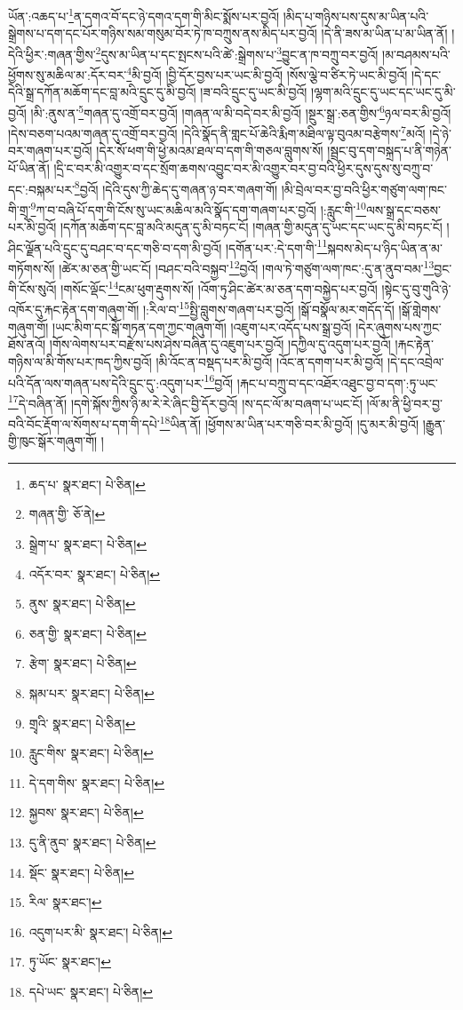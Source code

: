 ཡོན་:འཆད་པ་\footnote{ཆད་པ་  སྣར་ཐང་།  པེ་ཅིན། }ན་དགའ་བོ་དང་ཉེ་དགའ་དག་གི་མིང་སྨོས་པར་བྱའོ། །མིད་པ་གཉིས་པས་དུས་མ་ཡིན་པའི་སྒྲེགས་པ་དག་དང་པོར་གཉིས་སམ་གསུམ་བོར་ཏེ་ཁ་བཀྲུས་ནས་མིད་པར་བྱའོ། །དེ་ནི་ཟས་མ་ཡིན་པ་མ་ཡིན་ནོ། །དེའི་ཕྱིར་:གཞན་གྱིས་\footnote{གཞན་གྱི་  ཅོ་ནེ། }དུས་མ་ཡིན་པ་དང་སྤངས་པའི་ཚེ་:སྒྲེགས་པ་\footnote{སྒྲེག་པ་  སྣར་ཐང་།  པེ་ཅིན། }བྱུང་ན་ཁ་བཀྲུ་བར་བྱའོ། །མ་བཤམས་པའི་ཕྱོགས་སུ་མཆིལ་མ་:དོར་བར་\footnote{འདོར་བར་  སྣར་ཐང་།  པེ་ཅིན། }མི་བྱའོ། །བྱི་དོར་བྱས་པར་ཡང་མི་བྱའོ། །སོས་ལྕེ་བ་ཙིར་ཏེ་ཡང་མི་བྱའོ། །དེ་དང་དེའི་སྒྲ་དཀོན་མཆོག་དང་བླ་མའི་དྲུང་དུ་མི་བྱའོ། །ཟ་བའི་དྲུང་དུ་ཡང་མི་བྱའོ། །ལྷག་མའི་དྲུང་དུ་ཡང་དང་ཡང་དུ་མི་བྱའོ། །མི་:ནུས་ན་\footnote{ནུས་  སྣར་ཐང་།  པེ་ཅིན། }གཞན་དུ་འགྲོ་བར་བྱའོ། །གཞན་ལ་མི་བདེ་བར་མི་བྱའོ། །སྔུར་སྒྲ་:ཅན་གྱིས་\footnote{ཅན་གྱི་  སྣར་ཐང་།  པེ་ཅིན། }ཉལ་བར་མི་བྱའོ། །དེས་བཅག་པའམ་གཞན་དུ་འགྲོ་བར་བྱའོ། །དེའི་སྣོད་ནི་གླང་པོ་ཆེའི་རྨིག་མཐིལ་ལྟ་བུའམ་བརྩེགས་\footnote{རྩེག་  སྣར་ཐང་།  པེ་ཅིན། }མའོ། །དེ་ཉེ་བར་གཞག་པར་བྱའོ། །དེར་སོ་ཕག་གི་ཕྱེ་མའམ་ཐལ་བ་དག་གི་གཅལ་བླུགས་སོ། །སྦྲང་བུ་དག་བསྐྲད་པ་ནི་གཉེན་པོ་ཡིན་ནོ། །དྲི་ང་བར་མི་འགྱུར་བ་དང་སྲོག་ཆགས་འབྱུང་བར་མི་འགྱུར་བར་བྱ་བའི་ཕྱིར་དུས་དུས་སུ་བཀྲུ་བ་དང་:བསྐམ་པར་\footnote{སྐམ་པར་  སྣར་ཐང་།  པེ་ཅིན། }བྱའོ། །དེའི་དུས་ཀྱི་ཆེད་དུ་གཞན་ཉ་བར་གཞག་གོ། །མི་བྲེལ་བར་བྱ་བའི་ཕྱིར་གཙུག་ལག་ཁང་གི་གྲྭ་\footnote{གྲྭའི་  སྣར་ཐང་།  པེ་ཅིན། }ཀ་བ་བཞི་པོ་དག་གི་ངོས་སུ་ཡང་མཆིལ་མའི་སྣོད་དག་གཞག་པར་བྱའོ། །:རླུང་གི་\footnote{རླུང་གིས་  སྣར་ཐང་།  པེ་ཅིན། }ལས་སྒྲ་དང་བཅས་པར་མི་བྱའོ། །དཀོན་མཆོག་དང་བླ་མའི་མདུན་དུ་མི་བཏང་ངོ། །གཞན་གྱི་མདུན་དུ་ཡང་དང་ཡང་དུ་མི་བཏང་ངོ། །ཤིང་ལྗོན་པའི་དྲུང་དུ་བཤང་བ་དང་གཅི་བ་དག་མི་བྱའོ། །དགོན་པར་:དེ་དག་གི་\footnote{དེ་དག་གིས་  སྣར་ཐང་།  པེ་ཅིན། }སྐབས་མེད་པ་ཉིད་ཡིན་ན་མ་གཏོགས་སོ། །ཚེར་མ་ཅན་གྱི་ཡང་ངོ། །བཤང་བའི་བསྐྱབ་\footnote{སྐྱབས་  སྣར་ཐང་།  པེ་ཅིན། }བྱའོ། །གལ་ཏེ་གཙུག་ལག་ཁང་:དུ་ན་ནུབ་བམ་\footnote{དུ་ནི་ནུབ་  སྣར་ཐང་།  པེ་ཅིན། }བྱང་གི་ངོས་སུའོ། །གསོང་ལྡོང་\footnote{སྡོང་  སྣར་ཐང་།  པེ་ཅིན། }ངམ་ཕུག་རྡུགས་སོ། །འོག་ཏུ་ཤིང་ཚེར་མ་ཅན་དག་བསྐྱེད་པར་བྱའོ། །སྟེང་དུ་བུ་གུའི་ཉེ་འཁོར་དུ་རྐང་རྟེན་དག་གཞུག་གོ། །:རིལ་བ་\footnote{རིལ་  སྣར་ཐང་། }སྤྱི་བླུགས་གཞག་པར་བྱའོ། །སྒོ་བསྣོལ་མར་གདོད་དོ། །སྒོ་གླེགས་གཞུག་གོ། །ཡང་མིག་དང་སྒོ་གཏན་དག་ཀྱང་གཞུག་གོ། །འཇུག་པར་འདོད་པས་སྒྲ་བྱའོ། །དེར་ཞུགས་པས་ཀྱང་ཐོས་ནའོ། །གོས་ལེགས་པར་བརྫེས་པས་ཤེས་བཞིན་དུ་འཇུག་པར་བྱའོ། །དཀྱིལ་དུ་འདུག་པར་བྱའོ། །རྐང་རྟེན་གཉིས་ལ་མི་གོས་པར་ཁད་ཀྱིས་བྱའོ། །མི་འོང་ན་བསྡད་པར་མི་བྱའོ། །འོང་ན་དགག་པར་མི་བྱའོ། །དེ་དང་འབྲེལ་པའི་དོན་ལས་གཞན་པས་དེའི་དྲུང་དུ་:འདུག་པར་\footnote{འདུག་པར་མི་  སྣར་ཐང་།  པེ་ཅིན། }བྱའོ། །རྐང་པ་བཀྲུ་བ་དང་འཐོར་འཐུང་བྱ་བ་དག་:ཏུ་ཡང་\footnote{ཏུ་ཡོང་  སྣར་ཐང་། }དེ་བཞིན་ནོ། །དགེ་སྐོས་ཀྱིས་ཉི་མ་རེ་རེ་ཞིང་བྱི་དོར་བྱའོ། །ས་དང་ལོ་མ་བཞག་པ་ཡང་ངོ། །ལོ་མ་ནི་ཕྱི་བར་བྱ་བའི་བོང་རྡོག་ལ་སོགས་པ་དག་གི་དཔེ་\footnote{དཔེ་ཡང་  སྣར་ཐང་།  པེ་ཅིན། }ཡིན་ནོ། །ཕྱོགས་མ་ཡིན་པར་གཅི་བར་མི་བྱའོ། །དུ་མར་མི་བྱའོ། །རྒྱུན་གྱི་ཁུང་སྒོར་གཞུག་གོ། །

